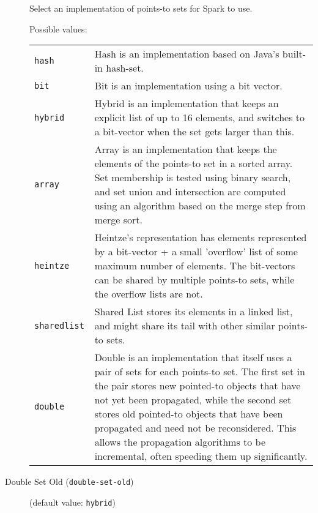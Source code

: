 \documentclass{article}
\begin{document}
\begin{description}
Select an implementation of points-to sets for Spark to use.




Possible values:\\
\begin{longtable}{p{1in}p{4in}}

{\tt hash }
&

Hash is an implementation based on Java's built-in hash-set.
\\

{\tt bit }
&

Bit is an implementation using a bit vector.
\\

{\tt hybrid }
&

Hybrid is an implementation that keeps an explicit list of up to
16 elements, and switches to a bit-vector when the set gets
larger than this.
\\

{\tt array }
&

Array is an implementation that keeps the elements of the
points-to set in a sorted array. Set membership is tested using
binary search, and set union and intersection are computed using
an algorithm based on the merge step from merge sort.
\\

{\tt heintze }
&
Heintze's representation has elements represented by a bit-vector + a small
									'overflow' list of some maximum number of elements.  The bit-vectors can be shared
									by multiple points-to sets, while the overflow lists are not.
								\\

{\tt sharedlist }
&
Shared List stores its elements in a linked list, and might share
									its tail with other similar points-to sets.
								\\

{\tt double }
&

Double is an implementation that itself uses a pair of sets for
each points-to set. The first set in the pair stores new pointed-to
objects that have not yet been propagated, while the second set stores
old pointed-to objects that have been propagated and need not be
reconsidered. This allows the propagation algorithms to be incremental,
often speeding them up significantly.
\\

\end{longtable}


\item[Double Set Old ({\tt double-set-old})]
(default value: {\tt hybrid})





\end{description}
\end{document}
